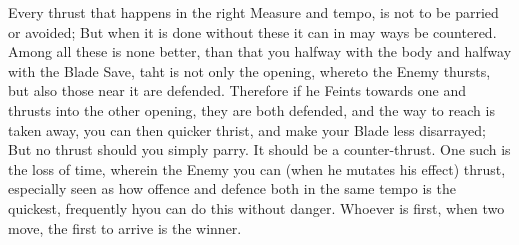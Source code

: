 Every thrust that happens in the right Measure and tempo, is not to be
parried or avoided; But when it is done without these it can in may
ways be countered. Among all these is none better, than that you
halfway with the body and halfway with the Blade Save, taht is not
only the opening, whereto the Enemy thursts, but also those near it
are defended. Therefore if he Feints towards one and thrusts into the
other opening, they are both defended, and the way to reach is taken
away, you can then quicker thrist, and make your Blade less
disarrayed; But no thrust should you simply parry. It should be a
counter-thrust.
One such is the loss of time, wherein the Enemy you can (when he mutates
his effect) thrust, especially seen as how offence and defence both in
the same tempo is the quickest, frequently hyou can do this without
danger. Whoever is first, when two move, the first to arrive is the winner.


